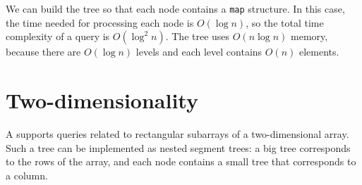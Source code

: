 \begin{center}
\end{center}

We can build the tree so
that each node contains a \texttt{map} structure.
In this case, the time needed for processing each
node is $O(\log n)$, so the total time complexity
of a query is $O(\log^2 n)$.
The tree uses $O(n \log n)$ memory,
because there are $O(\log n)$ levels
and each level contains
$O(n)$ elements.

\section{Two-dimensionality}


A  supports
queries related to rectangular subarrays
of a two-dimensional array.
Such a tree can be implemented as
nested segment trees: a big tree corresponds to the
rows of the array, and each node contains a small tree
that corresponds to a column.

